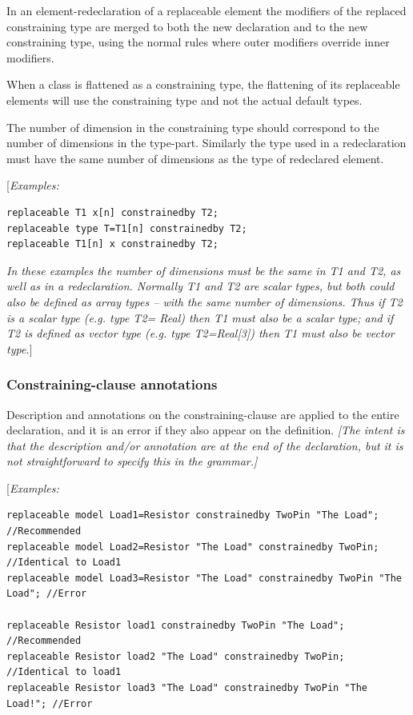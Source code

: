 \documentclass[10pt,a4paper]{report}
\def\doublelabel#1{\label{#1}\hypertarget{#1}{}}
\begin{document}
In an element-redeclaration of a replaceable element the modifiers of
the replaced constraining type are merged to both the new declaration
and to the new constraining type, using the normal rules where outer
modifiers override inner modifiers.

When a class is flattened as a constraining type, the flattening of its
replaceable elements will use the constraining type and not the actual
default types.

The number of dimension in the constraining type should correspond to
the number of dimensions in the type-part. Similarly the type used in a
redeclaration must have the same number of dimensions as the type of
redeclared element.

{[}\emph{Examples:}
\begin{lstlisting}[language=modelica]
replaceable T1 x[n] constrainedby T2;
replaceable type T=T1[n] constrainedby T2;
replaceable T1[n] x constrainedby T2;
\end{lstlisting}

\emph{In these examples the number of dimensions must be the same in T1
and T2, as well as in a redeclaration. Normally T1 and T2 are scalar
types, but both could also be defined as array types -- with the same
number of dimensions. Thus if T2 is a scalar type (e.g. type T2= Real)
then T1 must also be a scalar type; and if T2 is defined as vector type
  (e.g. type T2=Real[3]) then T1 must also be vector type.}]
\subsubsection{Constraining-clause annotations}\doublelabel{constraining-clause-annotations}

Description and annotations on the constraining-clause are applied to
the entire declaration, and it is an error if they also appear on the
definition. \emph{{[}The intent is that the description and/or
annotation are at the end of the declaration, but it is not
straightforward to specify this in the grammar.{]}}

{[}\emph{Examples:}
\begin{lstlisting}[language=modelica]
replaceable model Load1=Resistor constrainedby TwoPin "The Load"; //Recommended
replaceable model Load2=Resistor "The Load" constrainedby TwoPin; //Identical to Load1
replaceable model Load3=Resistor "The Load" constrainedby TwoPin "The Load"; //Error

replaceable Resistor load1 constrainedby TwoPin "The Load"; //Recommended
replaceable Resistor load2 "The Load" constrainedby TwoPin; //Identical to load1 
replaceable Resistor load3 "The Load" constrainedby TwoPin "The Load!"; //Error
\end{lstlisting}
\end{document}
